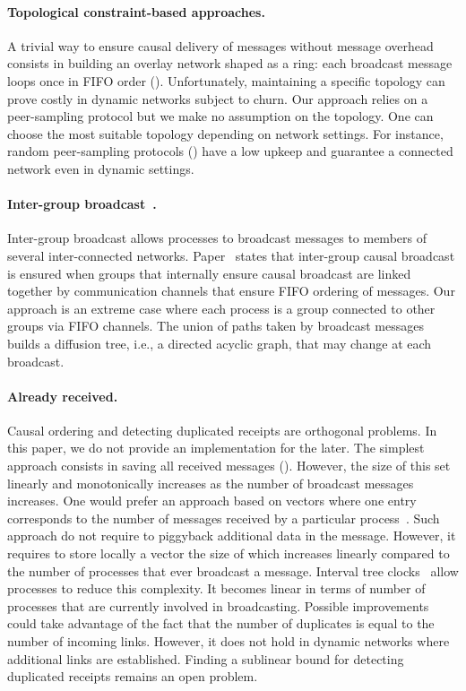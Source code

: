 \paragraph{Topological constraint-based approaches.} A trivial way to ensure
causal delivery of messages without message overhead consists in building an
overlay network shaped as a ring: each broadcast message loops once in FIFO
order (\REF). Unfortunately, maintaining a specific topology can prove costly in
dynamic networks subject to churn. Our approach relies on a peer-sampling
protocol but we make no assumption on the topology. One can choose the most
suitable topology depending on network settings. For instance, random
peer-sampling protocols (\REF) have a low upkeep and guarantee a connected
network even in dynamic settings.



\paragraph{Inter-group
  broadcast~\cite{johnson1998scalable,johnson1999intergroup}.} Inter-group
broadcast allows processes to broadcast messages to members of several
inter-connected networks. Paper~\cite{johnson1999intergroup} states that
inter-group causal broadcast is ensured when groups that internally ensure
causal broadcast are linked together by communication channels that ensure FIFO
ordering of messages. Our approach is an extreme case where each process is a
group connected to other groups via FIFO channels. The union of paths taken by
broadcast messages builds a diffusion tree, i.e., a directed acyclic graph, that
may change at each broadcast.

\paragraph{Already received.} Causal ordering and detecting duplicated receipts
are orthogonal problems. In this paper, we do not provide an implementation for
the later. The simplest approach consists in saving all received messages
(\REF). However, the size of this set linearly and monotonically increases as
the number of broadcast messages increases. One would prefer an approach based
on vectors where one entry corresponds to the number of messages received by a
particular process~\cite{fidge1988timestamps}. Such approach do not require to
piggyback additional data in the message. However, it requires to store locally
a vector the size of which increases linearly compared to the number of
processes that ever broadcast a message. Interval tree
clocks~\cite{almeida2008interval} allow processes to reduce this complexity. It
becomes linear in terms of number of processes that are currently involved in
broadcasting. Possible improvements could take advantage of the fact that the
number of duplicates is equal to the number of incoming links. However, it does
not hold in dynamic networks where additional links are established. Finding a
sublinear bound for detecting duplicated receipts remains an open problem.

